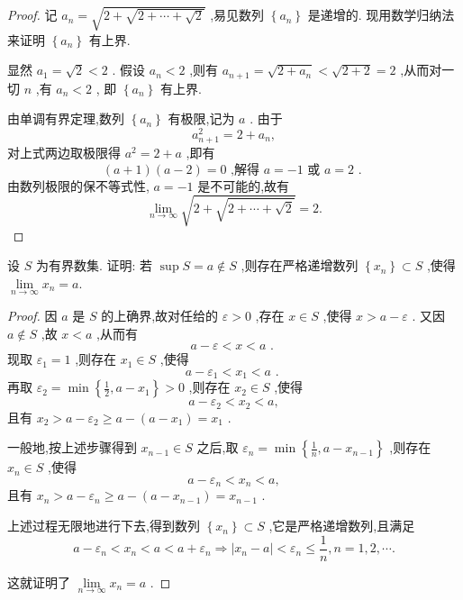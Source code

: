 \begin{proof}
记 \({a}_{n} = \sqrt{2 + \sqrt{2 + \cdots  + \sqrt{2}}}\) ,易见数列 \(\left\{  {a}_{n}\right\}\) 是递增的. 现用数学归纳法来证明 \(\left\{  {a}_{n}\right\}\) 有上界.

显然 \({a}_{1} = \sqrt{2} < 2\) . 假设 \({a}_{n} < 2\) ,则有 \({a}_{n + 1} = \sqrt{2 + {a}_{n}} < \sqrt{2 + 2} = 2\) ,从而对一切 \(n\) ,有 \({a}_{n} < 2\) , 即 \(\left\{  {a}_{n}\right\}\) 有上界.

由单调有界定理,数列 \(\left\{  {a}_{n}\right\}\) 有极限,记为 \(a\) . 由于
\[
{a}_{n + 1}^{2} = 2 + {a}_{n},
\]
对上式两边取极限得 \({a}^{2} = 2 + a\) ,即有
\[
\left( {a + 1}\right) \left( {a - 2}\right)  = 0\text{ ,解得 }a =  - 1\text{ 或 }a = 2\text{ . }
\]
由数列极限的保不等式性, \(a =  - 1\) 是不可能的,故有
\[
\mathop{\lim }\limits_{{n \rightarrow  \infty }}\sqrt{2 + \sqrt{2 + \cdots  + \sqrt{2}}} = 2.
\]
\end{proof}


\begin{example}
设 \(S\) 为有界数集. 证明: 若 \(\sup S = a \notin  S\) ,则存在严格递增数列 \(\left\{  {x}_{n}\right\}   \subset  S\) ,使得 \(\mathop{\lim }\limits_{{n \rightarrow  \infty }}{x}_{n} = a.\)
\end{example}


\begin{proof}
因 \(a\) 是 \(S\) 的上确界,故对任给的 \(\varepsilon  > 0\) ,存在 \(x \in  S\) ,使得 \(x > a - \varepsilon\) . 又因 \(a \notin  S\) ,故 \(x < a\) ,从而有
\[
a - \varepsilon  < x < a\text{ . }
\]
现取 \({\varepsilon }_{1} = 1\) ,则存在 \({x}_{1} \in  S\) ,使得
\[
a - {\varepsilon }_{1} < {x}_{1} < a\text{ . }
\]
再取 \({\varepsilon }_{2} = \min \left\{  {\frac{1}{2},a - {x}_{1}}\right\}   > 0\) ,则存在 \({x}_{2} \in  S\) ,使得
\[
a - {\varepsilon }_{2} < {x}_{2} < a,
\]
且有 \({x}_{2} > a - {\varepsilon }_{2} \geq  a - \left( {a - {x}_{1}}\right)  = {x}_{1}\) .

一般地,按上述步骤得到 \({x}_{n - 1} \in  S\) 之后,取 \({\varepsilon }_{n} = \min \left\{  {\frac{1}{n},a - {x}_{n - 1}}\right\}\) ,则存在 \({x}_{n} \in  S\) ,使得
\[
a - {\varepsilon }_{n} < {x}_{n} < a,
\]
且有 \({x}_{n} > a - {\varepsilon }_{n} \geq  a - \left( {a - {x}_{n - 1}}\right)  = {x}_{n - 1}\) .

上述过程无限地进行下去,得到数列 \(\left\{  {x}_{n}\right\}   \subset  S\) ,它是严格递增数列,且满足
\[
a - {\varepsilon }_{n} < {x}_{n} < a < a + {\varepsilon }_{n} \Rightarrow  \left| {{x}_{n} - a}\right|  < {\varepsilon }_{n} \leq  \frac{1}{n},n = 1,2,\cdots .
\]

这就证明了 \(\mathop{\lim }\limits_{{n \rightarrow  \infty }}{x}_{n} = a\) .
\end{proof}


